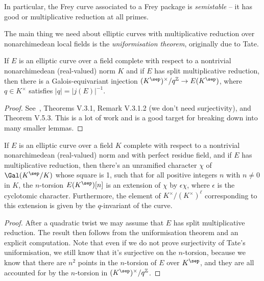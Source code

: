 In particular, the Frey curve associated to a Frey package is \emph{semistable} -- it has good or
 multiplicative reduction at all primes.

The main thing we need about elliptic curves with multiplicative reduction over nonarchimedean
local fields is the \emph{uniformisation theorem}, originally due to Tate.

\begin{theorem}\label{Tate_curve_uniformisation}\notready If $E$ is an elliptic curve over a field
  complete with respect to a nontrivial nonarchimedean (real-valued) norm $K$ and if $E$ has split
  multiplicative reduction, then there is a Galois-equivariant injection
  $(K^{\sep})^\times/q^{\mathbb{Z}}\to E(K^{\sep})$, where $q\in K^\times$ satisfies
  $|q|=|j(E)|^{-1}$.
\end{theorem}
\begin{proof}
  See~\cite{silverman2}, Theorems V.3.1, Remark V.3.1.2 (we don't need surjectivity),
  and Theorem V.5.3. This is a lot of work and is a good target for breaking down into many smaller lemmas.
\end{proof}

\begin{corollary}\label{multiplicative_reduction_torsion} If $E$ is an elliptic curve
  over a field $K$ complete with respect to a nontrivial nonarchimedean (real-valued) norm
  and with perfect residue field, and if $E$ has multiplicative reduction, then there's
  an unramified character $\chi$ of $\Gal(K^{\sep}/K)$ whose square is 1, such that for
  all positive integers $n$ with $n\not=0$ in $K$, the
  $n$-torsion $E(K^{\sep})[n]$ is an extension of $\chi$ by $\epsilon\chi$, where $\epsilon$ is the
  cyclotomic character. Furthermore, the element of $K^\times/(K^\times)^\ell$ corresponding
  to this extension is given by the $q$-invariant of the curve.
\end{corollary}
\begin{proof} After a quadratic twist we may assume that $E$ has split multiplicative reduction.
  The result then follows from the uniformisation theorem and an explicit computation.
  Note that even if we do not prove surjectivity of Tate's uniformisation, we still know
  that it's surjective on the $n$-torsion, because we know that there are $n^2$ points in the $n$-torsion of $E$ over $K^{\sep}$, and they are all accounted for by the $n$-torsion in $(K^{\sep})^\times/q^{\mathbb{Z}}$.
\end{proof}

